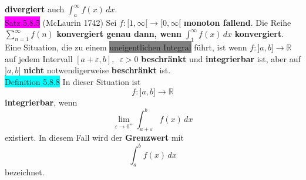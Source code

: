 \documentclass[landscape, 10pt]{article}
\newcommand{\R}{\mathbb{R}}
\begin{document}
\begin{multicols}{3}
                            \textbf{divergiert} auch 
                            \textcolor{NavyBlue}{
                            $\int_a^\infty f(x)\,dx$}.\\
              \colorbox{magenta}{Satz 5.8.5} 
              (McLaurin 1742) 
                     Sei \textcolor{NavyBlue}{
                     $f:[1,\infty[\longrightarrow[0,\infty[$} 
                     \textbf{monoton fallend}. Die Reihe 
                     \textcolor{NavyBlue}{
                     $\sum_{n=1}^\infty f(n)$} 
                     \textbf{konvergiert genau dann, wenn} 
                     \textcolor{NavyBlue}{
                     $\int_1^\infty f(x)\,dx$} 
                     \textbf{konvergiert}. \\
              Eine Situation, die zu einem 
                     \colorbox{gray}{uneigentlichen Integral} 
                     führt, ist wenn \textcolor{NavyBlue}{
                     $f:]a,b]\longrightarrow\R$} 
                     auf jedem Intervall 
                     \textcolor{NavyBlue}{
                     $[a+\varepsilon,b],\enspace\varepsilon>0$} 
                     \textbf{beschränkt} und 
                     \textbf{integrierbar} ist, aber auf 
                     \textcolor{NavyBlue}{$]a,b]$} 
                     \textbf{nicht} notwendigerweise 
                     \textbf{beschränkt} ist. \\
              \vfill\null
              \columnbreak
              \colorbox{cyan}{Definition 5.8.8} 
                     In dieser Situation ist
                     \begin{equation*}
                            f:]a,b]\longrightarrow\R
                     \end{equation*}
                     \textbf{integrierbar}, wenn
                     \begin{equation*}
                            \lim\limits_{\varepsilon\to0^+}
                            \int_{a+\varepsilon}^bf(x)\,dx  
                     \end{equation*}
                     existiert. In diesem Fall wird der 
                     \textbf{Grenzwert} mit
                     \begin{equation*}
                            \int_a^bf(x)\,dx
                     \end{equation*}
                     bezeichnet. \\


\end{multicols}
\end{document}
